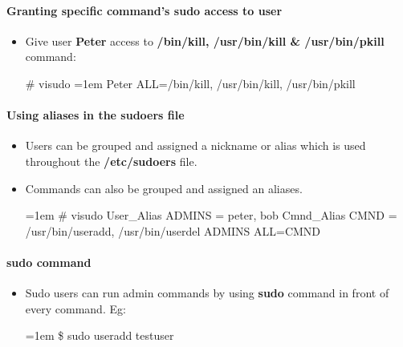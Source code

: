 \begin{flushleft}
	\paragraph{Granting specific command's sudo access to user}
	\bigskip
	\begin{itemize}
		\item Give user \textbf{Peter} access to \textbf{/bin/kill, /usr/bin/kill \& /usr/bin/pkill} command:
		\bigskip
			\begin{tcolorbox}[breakable,notitle,boxrule=-0pt,colback=black,colframe=black]
			\color{green}
			\# visudo
			\font=1em
			\newline
			\color{white}
			Peter ALL=/bin/kill, /usr/bin/kill, /usr/bin/pkill
			\font=4pt
		\end{tcolorbox}
	
	\end{itemize}
	
	
	\paragraph{Using aliases in the sudoers file}
	\begin{itemize}
		\item Users can be grouped and assigned a nickname or alias which is used throughout the \textbf{/etc/sudoers} file. 
		\item Commands can also be grouped and assigned an aliases.
		\bigskip
		\begin{tcolorbox}[breakable,notitle,boxrule=-0pt,colback=black,colframe=black]
			\color{green}
			\font=1em
			\# visudo
			\newline
			\color{white}
			User\_Alias ADMINS = peter, bob
			\newline
			Cmnd\_Alias CMND = /usr/bin/useradd, /usr/bin/userdel 
			\newline
			ADMINS ALL=CMND
			\font=4pt
		\end{tcolorbox}	
	\end{itemize}
	
	
	\paragraph{sudo command}
	\begin{itemize}
		\item Sudo users can run admin commands by using \textbf{sudo} command in front of every command.
		\newline
		Eg:
		\bigskip
		\begin{tcolorbox}[breakable,notitle,boxrule=-0pt,colback=black,colframe=black]
			\color{green}
			\font=1em
			\$ sudo useradd testuser
			\font=4pt
		\end{tcolorbox}
	\end{itemize}
	

	
\end{flushleft}

\newpage

